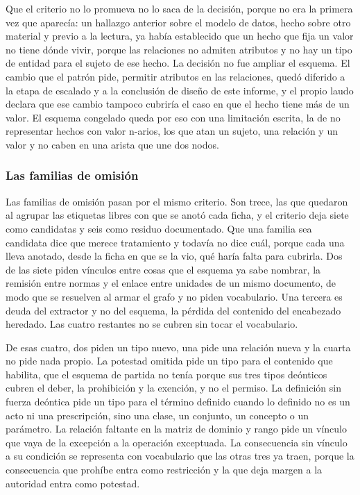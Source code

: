 \documentclass[12pt,a4paper]{report}
\begin{document}
Que el criterio no lo promueva no lo saca de la decisión, porque no era la primera vez que aparecía: un hallazgo anterior sobre el modelo de datos, hecho sobre otro material y previo a la lectura, ya había establecido que un hecho que fija un valor no tiene dónde vivir, porque las relaciones no admiten atributos y no hay un tipo de entidad para el sujeto de ese hecho. La decisión no fue ampliar el esquema. El cambio que el patrón pide, permitir atributos en las relaciones, quedó diferido a la etapa de escalado y a la conclusión de diseño de este informe, y el propio laudo declara que ese cambio tampoco cubriría el caso en que el hecho tiene más de un valor. El esquema congelado queda por eso con una limitación escrita, la de no representar hechos con valor n-arios, los que atan un sujeto, una relación y un valor y no caben en una arista que une dos nodos.

\subsubsection*{Las familias de omisión}

Las familias de omisión pasan por el mismo criterio. Son trece, las que quedaron al agrupar las etiquetas libres con que se anotó cada ficha, y el criterio deja siete como candidatas y seis como residuo documentado. Que una familia sea candidata dice que merece tratamiento y todavía no dice cuál, porque cada una lleva anotado, desde la ficha en que se la vio, qué haría falta para cubrirla. Dos de las siete piden vínculos entre cosas que el esquema ya sabe nombrar, la remisión entre normas y el enlace entre unidades de un mismo documento, de modo que se resuelven al armar el grafo y no piden vocabulario. Una tercera es deuda del extractor y no del esquema, la pérdida del contenido del encabezado heredado. Las cuatro restantes no se cubren sin tocar el vocabulario.

De esas cuatro, dos piden un tipo nuevo, una pide una relación nueva y la cuarta no pide nada propio. La potestad omitida pide un tipo para el contenido que habilita, que el esquema de partida no tenía porque sus tres tipos deónticos cubren el deber, la prohibición y la exención, y no el permiso. La definición sin fuerza deóntica pide un tipo para el término definido cuando lo definido no es un acto ni una prescripción, sino una clase, un conjunto, un concepto o un parámetro. La relación faltante en la matriz de dominio y rango pide un vínculo que vaya de la excepción a la operación exceptuada. La consecuencia sin vínculo a su condición se representa con vocabulario que las otras tres ya traen, porque la consecuencia que prohíbe entra como restricción y la que deja margen a la autoridad entra como potestad.
\end{document}
